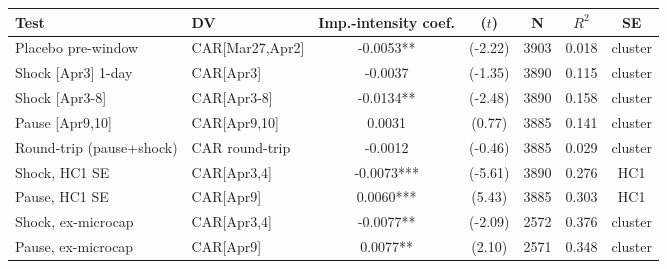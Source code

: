 \begin{tabular}{llccccc}
\toprule
Test & DV & Imp.-intensity coef. & ($t$) & N & $R^2$ & SE \\
\midrule
Placebo pre-window & CAR[Mar27,Apr2] & -0.0053** & (-2.22) & 3903 & 0.018 & cluster \\
Shock [Apr3] 1-day & CAR[Apr3] & -0.0037 & (-1.35) & 3890 & 0.115 & cluster \\
Shock [Apr3-8] & CAR[Apr3-8] & -0.0134** & (-2.48) & 3890 & 0.158 & cluster \\
Pause [Apr9,10] & CAR[Apr9,10] & 0.0031 & (0.77) & 3885 & 0.141 & cluster \\
Round-trip (pause+shock) & CAR round-trip & -0.0012 & (-0.46) & 3885 & 0.029 & cluster \\
Shock, HC1 SE & CAR[Apr3,4] & -0.0073*** & (-5.61) & 3890 & 0.276 & HC1 \\
Pause, HC1 SE & CAR[Apr9] & 0.0060*** & (5.43) & 3885 & 0.303 & HC1 \\
Shock, ex-microcap & CAR[Apr3,4] & -0.0077** & (-2.09) & 2572 & 0.376 & cluster \\
Pause, ex-microcap & CAR[Apr9] & 0.0077** & (2.10) & 2571 & 0.348 & cluster \\
\bottomrule
\end{tabular}